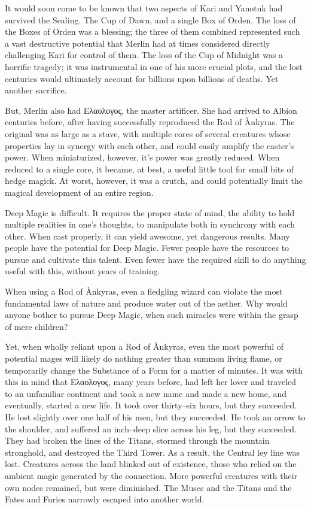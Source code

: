 It would soon come to be known that two aspects of Kari and Yanotuk had survived the Sealing. The Cup of Dawn, and a single Box of Orden. The loss of the Boxes of Orden was a blessing; the three of them combined represented such a vast destructive potential that Merlin had at times considered directly challenging Kari for control of them. The loss of the Cup of Midnight was a horrific tragedy; it was instrumental in one of his more crucial plots, and the lost centuries would ultimately account for billions upon billions of deaths. Yet another sacrifice.

But, Merlin also had Ελαολογος, the master artificer. She had arrived to Albion centuries before, after having successfully reproduced the Rod of Ànkyras. The original was as large as a stave, with multiple cores of several creatures whose properties lay in synergy with each other, and could easily amplify the caster’s power. When miniaturized, however, it’s power was greatly reduced. When reduced to a single core, it became, at best, a useful little tool for small bits of hedge magick. At worst, however, it was a crutch, and could potentially limit the magical development of an entire region.

Deep Magic is difficult. It requires the proper state of mind, the ability to hold multiple realities in one’s thoughts, to manipulate both in synchrony with each other. When cast properly, it can yield awesome, yet dangerous results. Many people have the potential for Deep Magic. Fewer people have the resources to pursue and cultivate this talent. Even fewer have the required skill to do anything useful with this, without years of training.

When using a Rod of Ànkyras, even a fledgling wizard can violate the most fundamental laws of nature and produce water out of the aether. Why would anyone bother to pursue Deep Magic, when such miracles were within the grasp of mere children?

Yet, when wholly reliant upon a Rod of Ànkyras, even the most powerful of potential mages will likely do nothing greater than summon living flame, or temporarily change the Substance of a Form for a matter of minutes. It was with this in mind that Ελαολογος, many years before, had left her lover and traveled to an unfamiliar continent and took a new name and made a new home, and eventually, started a new life.
\simpleline
{}
It took over thirty\mbox{--}six hours, but they succeeded. He lost slightly over one half of his men, but they succeeded. He took an arrow to the shoulder, and suffered an inch\mbox{--}deep slice across his leg, but they succeeded. They had broken the lines of the Titans, stormed through the mountain stronghold, and destroyed the Third Tower.
\SmallVSpace
As a result, the Central ley line was lost. Creatures across the land blinked out of existence, those who relied on the ambient magic generated by the connection. More powerful creatures with their own nodes remained, but were diminished. The Muses and the Titans and the Fates and Furies narrowly escaped into another world.

